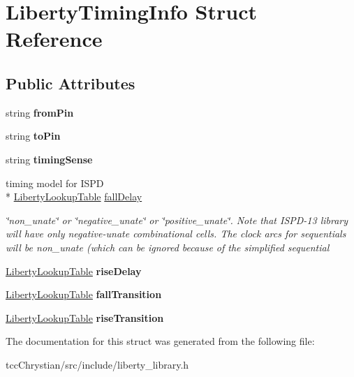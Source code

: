 \hypertarget{structLibertyTimingInfo}{\section{Liberty\-Timing\-Info Struct Reference}
\label{structLibertyTimingInfo}
}
\subsection*{Public Attributes}
\begin{DoxyCompactItemize}
\item 
\hypertarget{structLibertyTimingInfo_a6cb3b02b8c016a6a0f633ade7a8ee499}{string {\bfseries from\-Pin}}\label{structLibertyTimingInfo_a6cb3b02b8c016a6a0f633ade7a8ee499}

\item 
\hypertarget{structLibertyTimingInfo_a2bc2b4f64c8a8b71e314b97a37f14db4}{string {\bfseries to\-Pin}}\label{structLibertyTimingInfo_a2bc2b4f64c8a8b71e314b97a37f14db4}

\item 
\hypertarget{structLibertyTimingInfo_a54b164af0fb48cdbceb754858cbeface}{string {\bfseries timing\-Sense}}\label{structLibertyTimingInfo_a54b164af0fb48cdbceb754858cbeface}

\item 
\hypertarget{structLibertyTimingInfo_a4fdd676db9841962ef570a064ff97c81}{timing model for I\-S\-P\-D \\*
\hyperlink{structLibertyLookupTable}{Liberty\-Lookup\-Table} \hyperlink{structLibertyTimingInfo_a4fdd676db9841962ef570a064ff97c81}{fall\-Delay}}\label{structLibertyTimingInfo_a4fdd676db9841962ef570a064ff97c81}

\begin{DoxyCompactList}\small\item\em \char`\"{}non\-\_\-unate\char`\"{} or \char`\"{}negative\-\_\-unate\char`\"{} or \char`\"{}positive\-\_\-unate\char`\"{}. Note that I\-S\-P\-D-\/13 library will have only negative-\/unate combinational cells. The clock arcs for sequentials will be non\-\_\-unate (which can be ignored because of the simplified sequential \end{DoxyCompactList}\item 
\hypertarget{structLibertyTimingInfo_af2baf3e8053ed178d0d3dc8159ab8248}{\hyperlink{structLibertyLookupTable}{Liberty\-Lookup\-Table} {\bfseries rise\-Delay}}\label{structLibertyTimingInfo_af2baf3e8053ed178d0d3dc8159ab8248}

\item 
\hypertarget{structLibertyTimingInfo_a5af7b44ccbb69224084557182d2e3acb}{\hyperlink{structLibertyLookupTable}{Liberty\-Lookup\-Table} {\bfseries fall\-Transition}}\label{structLibertyTimingInfo_a5af7b44ccbb69224084557182d2e3acb}

\item 
\hypertarget{structLibertyTimingInfo_a1b31e1e18c0cc373e1eeaa1e999fbedd}{\hyperlink{structLibertyLookupTable}{Liberty\-Lookup\-Table} {\bfseries rise\-Transition}}\label{structLibertyTimingInfo_a1b31e1e18c0cc373e1eeaa1e999fbedd}

\end{DoxyCompactItemize}


The documentation for this struct was generated from the following file\-:\begin{DoxyCompactItemize}
\item 
tcc\-Chrystian/src/include/liberty\-\_\-library.\-h\end{DoxyCompactItemize}
